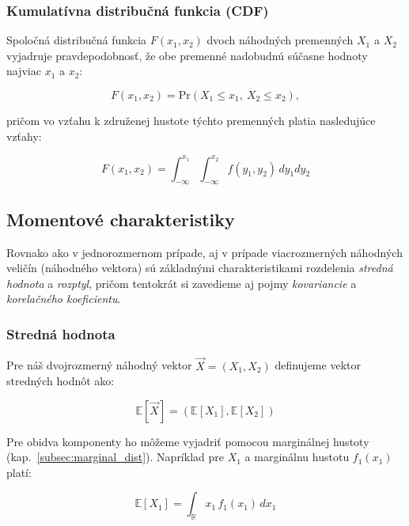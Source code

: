\subsubsection{Kumulatívna distribučná funkcia (CDF)}\label{subsec:joint_cdf}

Spoločná distribučná funkcia $F(x_1, x_2)$ dvoch náhodných premenných $X_1$ a $X_2$ vyjadruje pravdepodobnosť, že obe premenné nadobudnú súčasne hodnoty najviac $x_1$ a $x_2$:

\begin{equation}
F(x_1, x_2) = \mathrm{Pr}(X_1 \leq x_1,\ X_2 \leq x_2),
\end{equation}

pričom vo vzťahu k združenej hustote týchto premenných platia nasledujúce vzťahy:

\begin{equation}
F(x_1, x_2) = \int_{-\infty}^{x_1} \int_{-\infty}^{x_2} f(y_1, y_2) \, dy_1 dy_2
\end{equation}

\subsection{Momentové charakteristiky}\label{joint_moments}

Rovnako ako v jednorozmernom prípade, aj v prípade viacrozmerných náhodných veličín (náhodného vektora) sú základnými charakteristikami rozdelenia \textit{stredná hodnota} a \textit{rozptyl}, pričom tentokrát si zavedieme aj pojmy \textit{kovariancie} a \textit{korelačného koeficientu}.

\subsubsection{Stredná hodnota}\label{subsubsec:joint_mean}

Pre náš dvojrozmerný náhodný vektor \(\vec{X} = (X_1, X_2)\) definujeme vektor stredných hodnôt ako:

\begin{equation}
\mathbb{E}[\vec{X}] = \left( \mathbb{E}[X_1], \mathbb{E}[X_2] \right)
\end{equation}

Pre obidva komponenty ho môžeme vyjadriť pomocou marginálnej hustoty (kap.~\ref{subsec:marginal_dist}). Napríklad pre \(X_1\) a marginálnu hustotu \(f_1(x_1)\) platí:

\begin{equation}
\mathbb{E}[X_1] = \int_{\mathbb{R}} x_1 \, f_1(x_1) \, dx_1
\end{equation}

